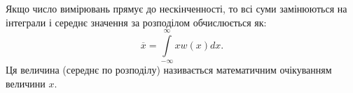 \documentclass{LabBook}
\begin{document}
%
%
%
%


Якщо число вимірювань прямує до нескінченності, то всі суми замінюються на інтеграли і середнє значення за розподілом обчислюється як:
\begin{equation}\label{eq:mean}
	\overline{x} = \int\limits_{-\infty}^{\infty} x w(x) dx .
\end{equation}
Ця величина (середнє по розподілу) називається математичним очікуванням величини $x$.
\end{document}

